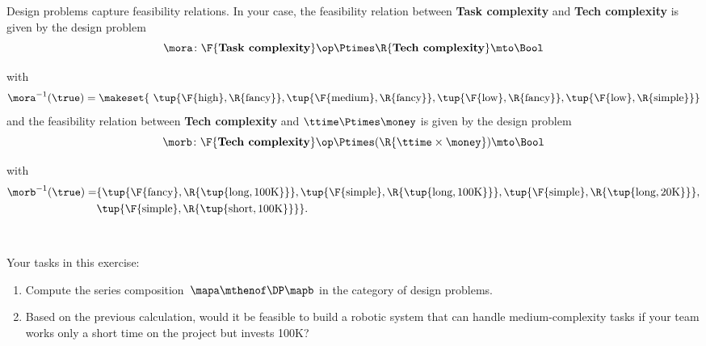 \begin{gradedexercise}
    Design problems capture feasibility relations.
    In your case, the feasibility relation between \textbf{Task complexity} and \textbf{Tech complexity} is given by the design problem
    \begin{equation}
        \mora\colon \F{\textbf{Task complexity}}\op \Ptimes \R{\textbf{Tech complexity}} \mto \Bool
    \end{equation}
    \begin{center}
    \end{center}
    with
    \begin{equation*}
        \mora^{-1}(\true) = \makeset{ \ \tup{\F{\text{high} }, \R{ \text{fancy} }}, \tup{\F{\text{medium} }, \R{ \text{fancy} }}, \tup{\F{\text{low} }, \R{ \text{fancy} }}, \tup{\F{\text{low} }, \R{ \text{simple} }}}
    \end{equation*}
    and the feasibility relation between \textbf{Tech complexity} and $\ttime \Ptimes \money$ is given by the design problem
    \begin{equation}
        \morb \colon \F{\textbf{Tech complexity}}\op \Ptimes (\R{\ttime \times \money}) \mto \Bool
    \end{equation}
    \begin{center}
    \end{center}
    with
    \begin{align*}
        \morb^{-1}(\true) = & \{ \tup{\F{\text{fancy} }, \R{ \tup{\text{long}, \text{100K}} }}, \tup{\F{\text{simple} }, \R{ \tup{\text{long}, \text{100K}} }}, \tup{\F{\text{simple} }, \R{ \tup{\text{long}, \text{20K}} }},\\
        & \tup{\F{\text{simple} }, \R{ \tup{\text{short}, \text{100K}} }} \}.
    \end{align*}

    \

    Your tasks in this exercise:
    \begin{enumerate}
        \item Compute the series composition~$\mapa \mthenof\DP \mapb$ in the category of design problems.
        \item Based on the previous calculation, would it be feasible to build a robotic system that can handle medium-complexity tasks if your team works only a short time on the project but invests 100K?
    \end{enumerate}
\end{gradedexercise}

